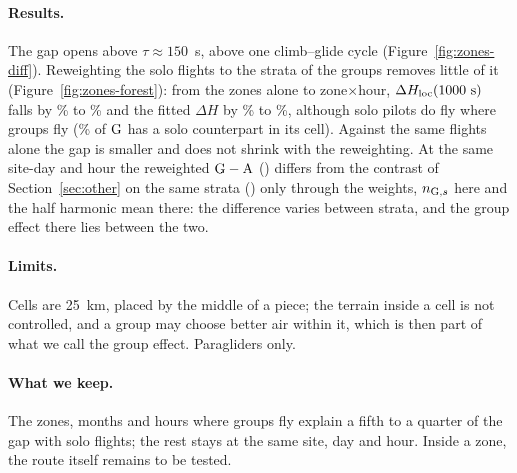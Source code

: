 \paragraph{Results.} The gap opens above $\tau\approx150$~s, above one climb--glide cycle
(Figure~\ref{fig:zones-diff}). Reweighting the solo flights to the strata of the groups removes little
of it (Figure~\ref{fig:zones-forest}): from the zones alone to zone$\times$hour,
$\Delta H_\mathrm{loc}(1000~\mathrm{s})$ falls by \ZoneRedLocZone\% to \ZoneRedLocZoneHour\% and the fitted
$\Delta H$ by \ZoneRedHZone\% to \ZoneRedHZoneHour\%, although solo pilots do fly where groups fly
(\ZoneKeptZone\% of $\mathrm{G}$ has a solo counterpart in its cell). Against the same flights alone the gap is
smaller and does not shrink with the reweighting. At the same site-day and hour the reweighted
$\mathrm{G}-\mathrm{A}$ (\ZoneDHlocASdh) differs from the contrast of Section~\ref{sec:other} on the same strata
(\DHlocThousandGroupSdh) only through the weights, $n_{\mathrm{G},s}$ here and the half harmonic mean there:
the difference varies between strata, and the group effect there lies between the two.

\paragraph{Limits.} Cells are 25~km, placed by the middle of a piece; the terrain inside a cell is
not controlled, and a group may choose better air within it, which is then part of what we call the
group effect. Paragliders only.

\paragraph{What we keep.} The zones, months and hours where groups fly explain a fifth to a quarter of
the gap with solo flights; the rest stays at the same site, day and hour. Inside a zone, the route
itself remains to be tested.
